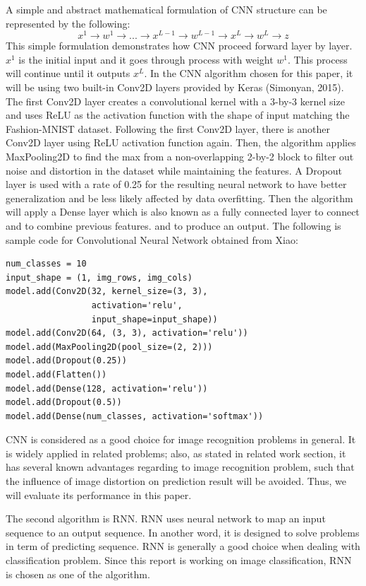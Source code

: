 \documentclass[letterpaper]{article} %
\begin{document}
A simple and abstract mathematical formulation of CNN structure can be represented by the following:
$$x^1\rightarrow w^1 \rightarrow ... \rightarrow x^{L-1} \rightarrow w^{L-1} \rightarrow x^L \rightarrow w^L \rightarrow z$$
This simple formulation demonstrates how CNN proceed forward layer by layer. $x^1$ is the initial input and it goes through process with weight $w^1$. This process will continue until it outputs $x^{L}$. In the CNN algorithm chosen for this paper, it will be using two built-in Conv2D layers provided by Keras (Simonyan, 2015). The first Conv2D layer creates a convolutional kernel with a 3-by-3 kernel size and uses ReLU as the activation function with the shape of input matching the Fashion-MNIST dataset. Following the first Conv2D layer, there is another Conv2D layer using ReLU activation function again. Then, the algorithm applies MaxPooling2D to find the max from a non-overlapping 2-by-2 block to filter out noise and distortion in the dataset while maintaining the features. A Dropout layer is used with a rate of 0.25 for the resulting neural network to have better generalization and be less likely affected by data overfitting. Then the algorithm will apply a Dense layer which is also known as a fully connected layer to connect and to combine previous features. and to produce an output. The following is sample code for Convolutional Neural Network obtained from Xiao:
\begin{lstlisting}[columns=fullflexible, keepspaces=true, stepnumber=1]
num_classes = 10
input_shape = (1, img_rows, img_cols)
model.add(Conv2D(32, kernel_size=(3, 3),
                 activation='relu',
                 input_shape=input_shape))
model.add(Conv2D(64, (3, 3), activation='relu'))
model.add(MaxPooling2D(pool_size=(2, 2)))
model.add(Dropout(0.25))
model.add(Flatten())
model.add(Dense(128, activation='relu'))
model.add(Dropout(0.5))
model.add(Dense(num_classes, activation='softmax'))
\end{lstlisting}

CNN is considered as a good choice for image recognition problems in general. It is widely applied in related problems; also, as stated in related work section, it has several known advantages regarding to image recognition problem, such that the influence of image distortion on prediction result will be avoided. Thus, we will evaluate its performance in this paper.

The second algorithm is RNN. RNN uses neural network to map an input sequence to an output sequence. In another word, it is designed to solve problems in term of predicting sequence. RNN is generally a good choice when dealing with classification problem. Since this report is working on image classification, RNN is chosen as one of the algorithm.
\end{document}
